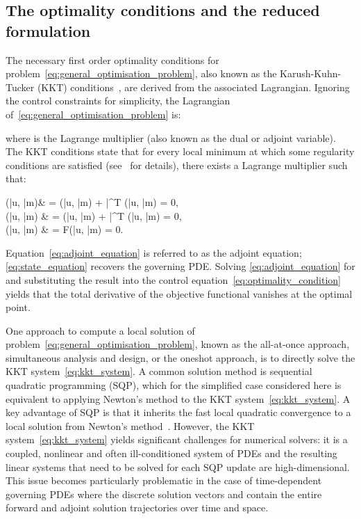 \documentclass[prodmode,acmtoms]{acmsmall}
\begin{document}
\subsection{The optimality conditions and the reduced formulation}\label{sec:the_optimality_system}
The necessary first order optimality conditions for problem~\eqref{eq:general_optimisation_problem}, also known as the Karush-Kuhn-Tucker (KKT) conditions~\cite{karush1939,kuhn1951},
are derived from the associated Lagrangian.
Ignoring the control constraints for simplicity, the Lagrangian of~\eqref{eq:general_optimisation_problem} is:

where  is the Lagrange multiplier (also known as the dual or adjoint variable).
The KKT conditions state that for every local minimum  at which some regularity conditions are satisfied (see~ for details), there exists a Lagrange multiplier  such that:

  (\bar u, \bar m)& = (\bar u, \bar m)  + \bar \lambda^T (\bar u, \bar m) = 0, \label{eq:optimality_condition} \\  
  (\bar u, \bar m) & = (\bar u, \bar m)  + \bar \lambda^T (\bar u, \bar m) = 0, \label{eq:adjoint_equation} \\  
  (\bar u, \bar m) & = F(\bar u, \bar m) = 0. \label{eq:state_equation} 
 
Equation~\eqref{eq:adjoint_equation} is referred to as the adjoint equation; \eqref{eq:state_equation} recovers the governing PDE.
Solving \eqref{eq:adjoint_equation} for  and substituting the result into the control equation~\eqref{eq:optimality_condition} yields that the total derivative of the objective functional vanishes at the optimal point.

One approach to compute a local solution of problem~\eqref{eq:general_optimisation_problem},
known as the all-at-once approach, simultaneous analysis and design, or the oneshot approach, is to directly solve the KKT system~\eqref{eq:kkt_system}. 
A common solution method is sequential quadratic programming (SQP), which for the simplified case considered here is equivalent to applying Newton's method to the KKT system~\eqref{eq:kkt_system}.
A key advantage of SQP is that it inherits the fast local quadratic convergence to a local solution from Newton's method~\cite{boggs1996}.
However, the KKT system~\eqref{eq:kkt_system} yields significant challenges for numerical solvers:
it is a coupled, nonlinear and often ill-conditioned system of PDEs and the resulting linear systems that need to be solved for each SQP update are high-dimensional.
This issue becomes particularly problematic in the case of time-dependent governing PDEs where the discrete solution vectors  and  contain the entire forward and adjoint solution trajectories over time and space.
\end{document}
